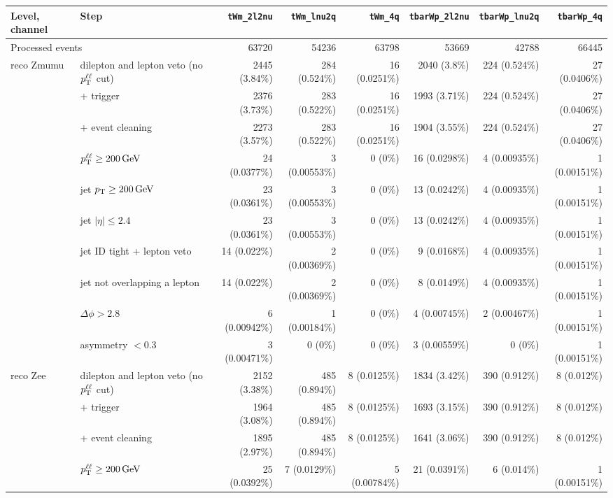 \begin{tabular}{llrrrrrr}
\toprule
Level, channel & Step & \texttt{tWm\_2l2nu} & \texttt{tWm\_lnu2q} & \texttt{tWm\_4q} & \texttt{tbarWp\_2l2nu} & \texttt{tbarWp\_lnu2q} & \texttt{tbarWp\_4q} \\
\midrule
\multicolumn{2}{l}{Processed events} & 63720 & 54236 & 63798 & 53669 & 42788 & 66445 \\
\midrule
reco Zmumu & dilepton and lepton veto (no $p_{\mathrm{T}}^{\ell\ell}$ cut) & 2445 (3.84\%) & 284 (0.524\%) & 16 (0.0251\%) & 2040 (3.8\%) & 224 (0.524\%) & 27 (0.0406\%) \\
 & + trigger & 2376 (3.73\%) & 283 (0.522\%) & 16 (0.0251\%) & 1993 (3.71\%) & 224 (0.524\%) & 27 (0.0406\%) \\
 & + event cleaning & 2273 (3.57\%) & 283 (0.522\%) & 16 (0.0251\%) & 1904 (3.55\%) & 224 (0.524\%) & 27 (0.0406\%) \\
 & $p_{\mathrm{T}}^{\ell\ell} \geq 200\,\mathrm{GeV}$ & 24 (0.0377\%) & 3 (0.00553\%) & 0 (0\%) & 16 (0.0298\%) & 4 (0.00935\%) & 1 (0.00151\%) \\
 & jet $p_{\mathrm{T}} \geq 200\,\mathrm{GeV}$ & 23 (0.0361\%) & 3 (0.00553\%) & 0 (0\%) & 13 (0.0242\%) & 4 (0.00935\%) & 1 (0.00151\%) \\
 & jet $|\eta| \leq 2.4$ & 23 (0.0361\%) & 3 (0.00553\%) & 0 (0\%) & 13 (0.0242\%) & 4 (0.00935\%) & 1 (0.00151\%) \\
 & jet ID tight + lepton veto & 14 (0.022\%) & 2 (0.00369\%) & 0 (0\%) & 9 (0.0168\%) & 4 (0.00935\%) & 1 (0.00151\%) \\
 & jet not overlapping a lepton & 14 (0.022\%) & 2 (0.00369\%) & 0 (0\%) & 8 (0.0149\%) & 4 (0.00935\%) & 1 (0.00151\%) \\
 & $\Delta\phi > 2.8$ & 6 (0.00942\%) & 1 (0.00184\%) & 0 (0\%) & 4 (0.00745\%) & 2 (0.00467\%) & 1 (0.00151\%) \\
 & asymmetry $< 0.3$ & 3 (0.00471\%) & 0 (0\%) & 0 (0\%) & 3 (0.00559\%) & 0 (0\%) & 1 (0.00151\%) \\
\midrule
reco Zee & dilepton and lepton veto (no $p_{\mathrm{T}}^{\ell\ell}$ cut) & 2152 (3.38\%) & 485 (0.894\%) & 8 (0.0125\%) & 1834 (3.42\%) & 390 (0.912\%) & 8 (0.012\%) \\
 & + trigger & 1964 (3.08\%) & 485 (0.894\%) & 8 (0.0125\%) & 1693 (3.15\%) & 390 (0.912\%) & 8 (0.012\%) \\
 & + event cleaning & 1895 (2.97\%) & 485 (0.894\%) & 8 (0.0125\%) & 1641 (3.06\%) & 390 (0.912\%) & 8 (0.012\%) \\
 & $p_{\mathrm{T}}^{\ell\ell} \geq 200\,\mathrm{GeV}$ & 25 (0.0392\%) & 7 (0.0129\%) & 5 (0.00784\%) & 21 (0.0391\%) & 6 (0.014\%) & 1 (0.00151\%) \\

\end{tabular}
